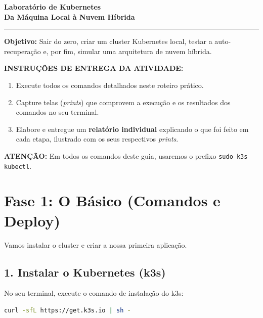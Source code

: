 \documentclass[11pt, a4paper]{article}
\begin{document}
\begin{center}
    {\LARGE \textbf{\color{primary} Laboratório de Kubernetes}} \\[4pt]
    {\large \textbf{\color{accent} Da Máquina Local à Nuvem Híbrida}} \\[8pt]
    \rule{\textwidth}{1pt}
\end{center}

\textbf{Objetivo:} Sair do zero, criar um cluster Kubernetes local, testar a auto-recuperação e, por fim, simular uma arquitetura de nuvem híbrida.

\begin{tcolorbox}[colback=infobg, colframe=infoframe, arc=3pt, boxrule=0.8pt]
\textbf{INSTRUÇÕES DE ENTREGA DA ATIVIDADE:}
\begin{enumerate}[leftmargin=*, topsep=3pt, itemsep=2pt]
    \item Execute todos os comandos detalhados neste roteiro prático.
    \item Capture telas (\textit{prints}) que comprovem a execução e os resultados dos comandos no seu terminal.
    \item Elabore e entregue um \textbf{relatório individual} explicando o que foi feito em cada etapa, ilustrado com os seus respectivos \textit{prints}.
\end{enumerate}
\end{tcolorbox}

\begin{tcolorbox}[colback=warnbg, colframe=warnframe, arc=3pt, boxrule=0.8pt]
\textbf{ATENÇÃO:} Em todos os comandos deste guia, usaremos o prefixo \texttt{sudo k3s kubectl}.
\end{tcolorbox}

\section*{Fase 1: O Básico (Comandos e Deploy)}

Vamos instalar o cluster e criar a nossa primeira aplicação.

\subsection*{1. Instalar o Kubernetes (k3s)}
No seu terminal, execute o comando de instalação do k3s:

\begin{lstlisting}[language=bash]
curl -sfL https://get.k3s.io | sh -
\end{lstlisting}
\end{document}

